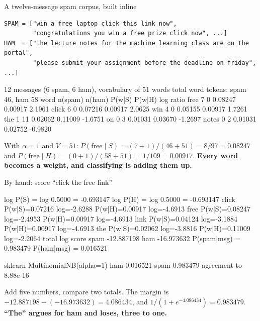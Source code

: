 \documentclass[aspectratio=169]{beamer}
\begin{document}
\begin{frame}[fragile,shrink=8]{A twelve-message spam corpus, built inline}
\begin{lstlisting}
SPAM = ["win a free laptop click this link now",
        "congratulations you win a free prize click now", ...]
HAM  = ["the lecture notes for the machine learning class are on the portal",
        "please submit your assignment before the deadline on friday", ...]
\end{lstlisting}
\begin{outblk}
12 messages (6 spam, 6 ham), vocabulary of 51 words
total word tokens: spam 46, ham 58
   word             n(spam)  n(ham)    P(w|S)    P(w|H)  log ratio
   free                   7       0   0.08247   0.00917     2.1961
   click                  6       0   0.07216   0.00917     2.0625
   win                    4       0   0.05155   0.00917     1.7261
   the                    1      11   0.02062   0.11009    -1.6751
   on                     0       3   0.01031   0.03670    -1.2697
   notes                  0       2   0.01031   0.02752    -0.9820
\end{outblk}
\begin{center}\small
  With $\alpha = 1$ and $V = 51$:
  $P(\text{free} \mid S) = (7+1)/(46+51) = 8/97 = 0.08247$ and
  $P(\text{free} \mid H) = (0+1)/(58+51) = 1/109 = 0.00917$.
  \textbf{Every word becomes a weight, and classifying is adding them up.}
\end{center}
\end{frame}

\begin{frame}[fragile,shrink=6]{By hand: score ``click the free link''}
\begin{outblk}
      log P(S)  = log 0.5000 = -0.693147
      log P(H)  = log 0.5000 = -0.693147
      click    P(w|S)=0.07216 log=-2.6288   P(w|H)=0.00917 log=-4.6913
      free     P(w|S)=0.08247 log=-2.4953   P(w|H)=0.00917 log=-4.6913
      link     P(w|S)=0.04124 log=-3.1884   P(w|H)=0.00917 log=-4.6913
      the      P(w|S)=0.02062 log=-3.8816   P(w|H)=0.11009 log=-2.2064
      total log score  spam -12.887198   ham -16.973632
      P(spam|msg) = 0.983479   P(ham|msg) = 0.016521
\end{outblk}
\begin{outblk}
   sklearn MultinomialNB(alpha=1)  ham 0.016521  spam 0.983479
   agreement to 8.88e-16
\end{outblk}
\begin{center}\small
  Add five numbers, compare two totals. The margin is
  $-12.887198 - (-16.973632) = 4.086434$, and
  $1/(1 + e^{-4.086434}) = 0.983479$. \textbf{``The'' argues for ham and
  loses, three to one.}
\end{center}
\end{frame}
\end{document}
